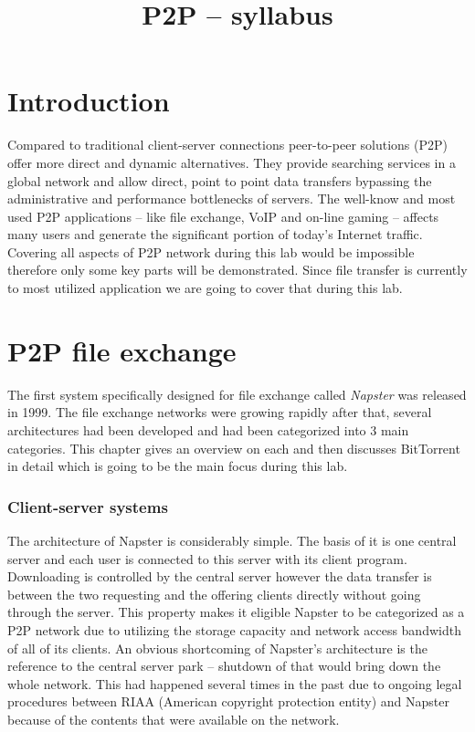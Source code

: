 \documentclass[a4paper]{article}
\title{P2P – syllabus}
\author{}
\date{}
\begin{document}
\maketitle

\tableofcontents

\section{Introduction}

Compared to traditional client-server connections peer-to-peer solutions (P2P) offer more direct and dynamic
alternatives. They provide searching services in a global network and allow direct, point to point data transfers
bypassing the administrative and performance bottlenecks of servers.
The well-know and most used P2P applications -- like file exchange, VoIP and on-line gaming -- affects many users and
generate the significant portion of today's Internet traffic. Covering all aspects of P2P network during this lab would
be impossible therefore only some key parts will be demonstrated. Since file transfer is currently to most utilized
application we are going to cover that during this lab.

\section{P2P file exchange}

The first system specifically designed for file exchange called \emph{Napster} was released in 1999. The file exchange
networks were growing rapidly after that, several architectures had been developed and had been categorized  into 3
main categories. This chapter gives an overview on each and then discusses BitTorrent in detail which is going to be
the main focus during this lab.

\subsubsection{Client-server systems}

The architecture of Napster is considerably simple. The basis of it is one central server and each user is connected to
this server with its client program. Downloading is controlled by the central server however the data transfer is
between the two requesting and the offering clients directly without going through the server. This property makes it
eligible Napster to be categorized as a P2P network due to utilizing the storage capacity and network access bandwidth
of all of its clients. An obvious shortcoming of Napster's architecture is the reference to the central server park --
shutdown of that would bring down the whole network. This had happened several times in the past due to ongoing legal
procedures between RIAA (American copyright protection entity) and Napster because of the contents that were available
on the network.
\end{document}
